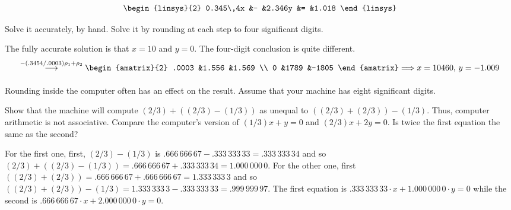 \begin{exercises}
\begin{equation*}
\begin{linsys}{2}
        0.345\,4x  &-  &2.346y  &=  &1.018
      \end{linsys}
    \end{equation*}
    \begin{exparts*}
      \partsitem Solve it accurately, by hand.
      \partsitem Solve it by
         rounding at each step to four significant digits. 
    \end{exparts*}
    \begin{answer}
      \begin{exparts}
        \partsitem The fully accurate solution is that $x=10$ and $y=0$.
        \partsitem The four-digit conclusion is quite different.
          \begin{equation*}
            \grstep{-(.3454/.0003)\rho_1+\rho_2}
            \begin{amatrix}{2}
              .0003  &1.556  &1.569  \\
              0      &1789   &-1805
            \end{amatrix}
            \Longrightarrow
            x=10460,\,y=-1.009
          \end{equation*}
      \end{exparts}
    \end{answer}
  \item 
    Rounding inside the computer often has an effect on the result.
    Assume that your machine has eight significant digits.
    \begin{exparts}
      \partsitem Show that the machine will compute 
         $(2/3)+((2/3)-(1/3))$ as unequal to $((2/3)+(2/3))-(1/3)$.
         Thus, computer arithmetic is not associative.
      \partsitem Compare the computer's version of $(1/3)x+y=0$
        and $(2/3)x+2y=0$.
        Is twice the first equation the same as the second?
    \end{exparts}
    \begin{answer}
      \begin{exparts}
        \partsitem For the first one, first, $(2/3)-(1/3)$ is 
          $.666\,666\,67-.333\,333\,33=.333\,333\,34$
          and so 
          $(2/3)+((2/3)-(1/3))=.666\,666\,67+.333\,333\,34=1.000\,000\,0$.
          For the other one, first 
          $((2/3)+(2/3))=.666\,666\,67+.666\,666\,67=1.333\,333\,3$
          and so 
          $((2/3)+(2/3))-(1/3)=1.333\,333\,3-.333\,333\,33=.999\,999\,97$.
        \partsitem The first equation is 
          $.333\,333\,33\cdot x+1.000\,000\,0\cdot y=0$
          while the second is 
          $.666\,666\,67\cdot x+2.000\,000\,0\cdot y=0$.

\end{exparts}
\end{answer}
\end{exercises}
